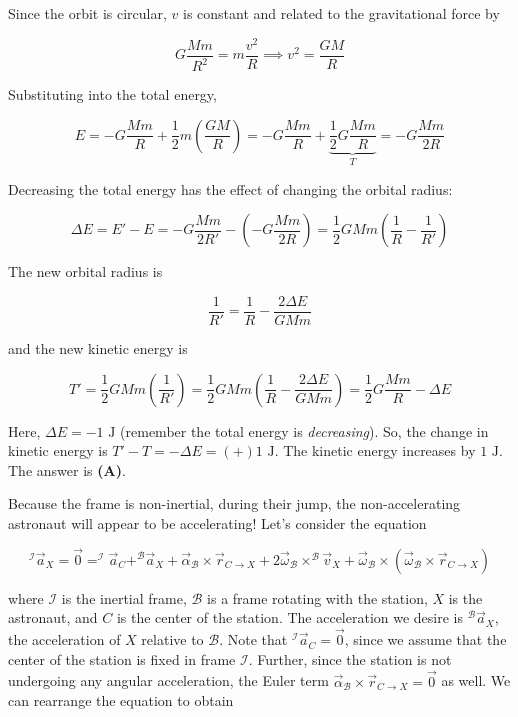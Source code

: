 \documentclass[12pt]{article}
\begin{document}
Since the orbit is circular, $v$ is constant and related to the gravitational force by

$$G \frac{M m}{R^2} = m \frac{v^2}{R} \implies v^2 = \frac{G M}{R}$$

Substituting into the total energy,

$$E = -G \frac{M m}{R} + \frac{1}{2} m \left( \frac{G M}{R} \right) = -G \frac{M m}{R} + \underbrace{\frac{1}{2} G \frac{M m}{R}}_{T} = -G \frac{M m}{2 R}$$

Decreasing the total energy has the effect of changing the orbital radius:

$$\Delta E = E' - E = -G \frac{M m}{2 R'} - \left( -G \frac{M m}{2 R} \right) = \frac{1}{2} G M m \left( \frac{1}{R} - \frac{1}{R'} \right)$$

The new orbital radius is

$$\frac{1}{R'} = \frac{1}{R} - \frac{2 \Delta E}{G M m}$$

and the new kinetic energy is

$$T' = \frac{1}{2} G M m \left( \frac{1}{R'} \right) = \frac{1}{2} G M m \left( \frac{1}{R} - \frac{2 \Delta E}{G M m} \right) = \frac{1}{2} G \frac{M m}{R} - \Delta E$$

Here, $\Delta E = -1 \text{ J}$ (remember the total energy is \textit{decreasing}). So, the change in kinetic energy is $T' - T = -\Delta E = (+) 1 \text{ J}$. The kinetic energy increases by $1 \text{ J}$. The answer is \textbf{(A)}.


\vspace{2 \baselineskip}



Because the frame is non-inertial, during their jump, the non-accelerating astronaut will appear to be accelerating! Let's consider the equation

$$^\mathcal{I} \vec{a}_X = \vec{0} = ^\mathcal{I} \vec{a}_C + ^\mathcal{B} \vec{a}_X + \vec{\alpha}_\mathcal{B} \times \vec{r}_{C \to X} + 2 \vec{\omega}_\mathcal{B} \times ^\mathcal{B} \vec{v}_X + \vec{\omega}_\mathcal{B} \times (\vec{\omega}_\mathcal{B} \times \vec{r}_{C \to X})$$

where $\mathcal{I}$ is the inertial frame, $\mathcal{B}$ is a frame rotating with the station, $X$ is the astronaut, and $C$ is the center of the station. The acceleration we desire is $^\mathcal{B} \vec{a}_X$, the acceleration of $X$ relative to $\mathcal{B}$. Note that $^\mathcal{I} \vec{a}_C = \vec{0}$, since we assume that the center of the station is fixed in frame $\mathcal{I}$. Further, since the station is not undergoing any angular acceleration, the Euler term $\vec{\alpha}_\mathcal{B} \times \vec{r}_{C \to X} = \vec{0}$ as well. We can rearrange the equation to obtain
\end{document}
